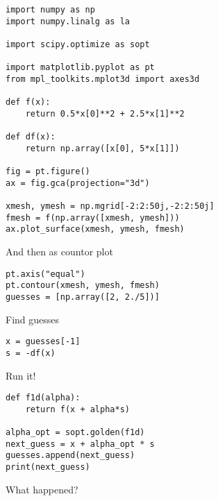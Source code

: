 \documentclass[%
oneside,                 %
final,                   %
10pt]{article}
\begin{document}
\begin{verbatim}
import numpy as np
import numpy.linalg as la

import scipy.optimize as sopt

import matplotlib.pyplot as pt
from mpl_toolkits.mplot3d import axes3d

def f(x):
    return 0.5*x[0]**2 + 2.5*x[1]**2

def df(x):
    return np.array([x[0], 5*x[1]])

fig = pt.figure()
ax = fig.gca(projection="3d")

xmesh, ymesh = np.mgrid[-2:2:50j,-2:2:50j]
fmesh = f(np.array([xmesh, ymesh]))
ax.plot_surface(xmesh, ymesh, fmesh)

\end{verbatim}

And then as countor plot




\begin{verbatim}
pt.axis("equal")
pt.contour(xmesh, ymesh, fmesh)
guesses = [np.array([2, 2./5])]

\end{verbatim}

Find guesses



\begin{verbatim}
x = guesses[-1]
s = -df(x)

\end{verbatim}

Run it!








\begin{verbatim}
def f1d(alpha):
    return f(x + alpha*s)

alpha_opt = sopt.golden(f1d)
next_guess = x + alpha_opt * s
guesses.append(next_guess)
print(next_guess)

\end{verbatim}

What happened?
\end{document}
